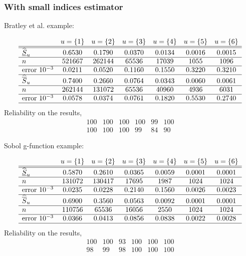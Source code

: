 \subsubsection{With small indices estimator}
Bratley et al. example:

\[
\begin{array}{lcccccc}
   & u=\{1\} & u=\{2\} & u=\{3\} & u=\{4\} & u=\{5\} & u=\{6\} \\ \hline \hline
 \widehat{\underline{S}}_u & 0.6530  &  0.1790  &  0.0370  &  0.0134  &  0.0016  &  0.0015 \\ \hline
 n & 521667  &    262144  &     65536  &  17039  &   1055  &      1096 \\ \hline
 \text{error } 10^{-3} & 0.0211  &  0.0520  &  0.1160  &  0.1550  &  0.3220  &  0.3210 \\ \hline
 \widehat{\overline{S}}_u & 0.7400  &  0.2660  &  0.0764  &  0.0343  &  0.0060  &  0.0061 \\  \hline
 n & 262144  &    131072  &   65536  &   40960  &  4936  &      6031 \\ \hline
 \text{error } 10^{-3} & 0.0578  &  0.0374  &  0.0761  &  0.1820  &  0.5530  &  0.2740 \\ \hline
\end{array}
\]
Reliability on the results,
\[
\begin{array}{ cccccc }
     100  & 100  & 100  & 100  &  99  & 100 \\
     100  & 100  & 100  &  99  &  84  &  90
\end{array}
\]


Sobol g-function example:

\[
\begin{array}{lcccccc}
   & u=\{1\} & u=\{2\} & u=\{3\} & u=\{4\} & u=\{5\} & u=\{6\} \\ \hline \hline
 \widehat{\underline{S}}_u & 0.5870  &  0.2610  &  0.0365 &   0.0059  &  0.0001  &  0.0001 \\ \hline
 n & 131072   &  130417  &  17695  &  1987  &  1024  &   1024 \\ \hline
 \text{error } 10^{-3} & 0.0235  &  0.0228  &  0.2140 & 0.1560  &  0.0026  &  0.0023 \\ \hline
 \widehat{\overline{S}}_u & 0.6900  &  0.3560  &  0.0563 &   0.0092  &  0.0001  &  0.0001 \\  \hline
 n & 110756  &  65536  &  16056  &  2550  &  1024  &  1024 \\ \hline
 \text{error } 10^{-3} & 0.0366 &  0.0413  &  0.0856 & 0.0838  &  0.0022  &  0.0028 \\ \hline
\end{array}
\]
Reliability on the results,
\[
\begin{array}{ cccccc }
     100  & 100  & 93  & 100  &  100  & 100 \\
     98  &  99  &  98 &  100  & 100 &  100
\end{array}
\]

